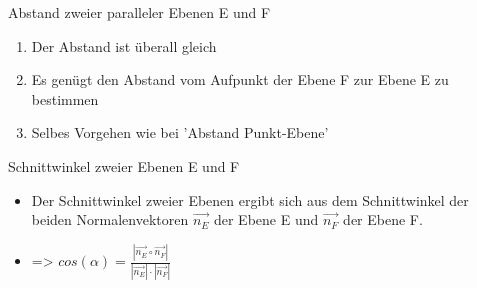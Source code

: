 \documentclass[paper=a6,landscape,ngerman,twoside=true,fontsize=12pt]{scrartcl}
\begin{document}
\begin{frage}
	Abstand zweier paralleler Ebenen E und F
	
\end{frage}
\begin{antwort} 
	\begin{enumerate} 
		\item Der Abstand ist überall gleich
		\item Es genügt den Abstand vom Aufpunkt der Ebene F zur Ebene E zu bestimmen
		\item Selbes Vorgehen wie bei 'Abstand Punkt-Ebene'	
	\end{enumerate} 
	
\end{antwort}
\begin{frage}
	Schnittwinkel zweier Ebenen E und F	
	
\end{frage}
\begin{antwort}
	
	\Large	
	\begin{itemize} 
		\item Der Schnittwinkel zweier Ebenen ergibt sich aus dem Schnittwinkel der beiden Normalenvektoren $\vec{n_E}$ der Ebene E und $\vec{n_F}$ der Ebene F.  
		\item => $cos(\alpha)=\frac{|\vec{n_E} \circ \vec{n_F}|}{|\vec{n_E}|\cdot|\vec{n_F}|}$
	\end{itemize} 	
\end{antwort}
\end{document}
